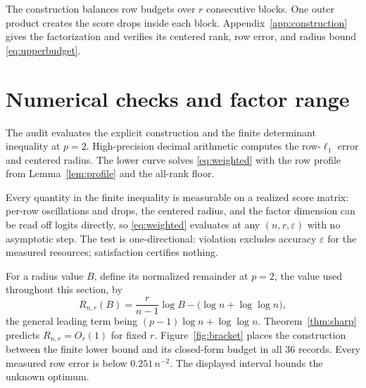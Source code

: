 \documentclass[10pt]{article}
\theoremstyle{definition}
\begin{document}
The construction balances row budgets over \(r\) consecutive blocks.  One
outer product creates the score drops inside each block.  Appendix~\ref{app:construction}
gives the factorization and verifies its centered rank,
row error, and radius bound \eqref{eq:upperbudget}.

\section{Numerical checks and factor range}\label{sec:numerical}

The audit evaluates the explicit construction and the finite determinant
inequality at \(p=2\).  High-precision decimal arithmetic computes the
row-\(\ell_1\) error and centered radius.  The lower curve solves
\eqref{eq:weighted} with the row profile from Lemma~\ref{lem:profile} and the
all-rank floor.

Every quantity in the finite inequality is measurable on a realized score
matrix: per-row oscillations and drops, the centered radius, and the factor
dimension can be read off logits directly, so \eqref{eq:weighted} evaluates
at any \((n,r,\varepsilon)\) with no asymptotic step.  The test is
one-directional: violation excludes accuracy \(\varepsilon\) for the measured
resources; satisfaction certifies nothing.

For a radius value \(B\), define its normalized remainder at \(p=2\), the
value used throughout this section, by
\[
 R_{n,r}(B)=\frac{r}{n-1}\log B-\bigl(\log n+\log\log n\bigr),
\]
the general leading term being \((p-1)\log n+\log\log n\).
Theorem~\ref{thm:sharp} predicts \(R_{n,r}=O_r(1)\) for fixed \(r\).
Figure~\ref{fig:bracket} places the construction between the finite lower bound
and its closed-form budget in all 36 records.  Every measured row error is
below \(0.251\,n^{-2}\).  The displayed interval bounds the unknown optimum.
\end{document}
